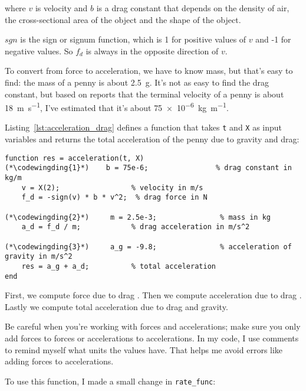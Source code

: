 where $v$ is velocity and
$b$ is a drag constant that depends on the density of
air, the cross-sectional area of the object and the shape
of the object.  

$sgn$ is the sign or signum function, which is 1 for positive values of 
$v$ and -1 for negative values.  So $f_d$ is always in the opposite direction of $v$.


To convert from force to acceleration, we have to know mass, but that's easy to find: the mass of a penny is about \SI{2.5}{\gram}.  It's not as easy to find the drag constant, but based on reports that the terminal velocity of a penny is about \SI{18}{\meter \per \second}, I've estimated that it's about \SI{75e-6}{\kilogram \per \meter}.

Listing~\ref{lst:acceleration_drag} defines a function that takes {\tt t} and {\tt X} as input variables and returns the total acceleration of the penny due to gravity and drag:

\begin{lstlisting}[caption={Calculating acceleration of a penny with drag}, label={lst:acceleration_drag}]
function res = acceleration(t, X)
(*\codewingding{1}*)    b = 75e-6;                % drag constant in kg/m
    v = X(2);                 % velocity in m/s
    f_d = -sign(v) * b * v^2;  % drag force in N

(*\codewingding{2}*)     m = 2.5e-3;               % mass in kg
    a_d = f_d / m;            % drag acceleration in m/s^2

(*\codewingding{3}*)     a_g = -9.8;               % acceleration of gravity in m/s^2
    res = a_g + a_d;          % total acceleration
end
\end{lstlisting}

First, we compute force due to drag .
Then we compute acceleration due to drag .
Lastly we compute total acceleration due to drag and gravity.


Be careful when you're working with forces and accelerations; make sure
you only add forces to forces or accelerations to accelerations.  In my
code, I use comments to remind myself what units the values have.
That helps me avoid errors like adding forces to accelerations.

To use this function, I made a small change in \verb"rate_func":

